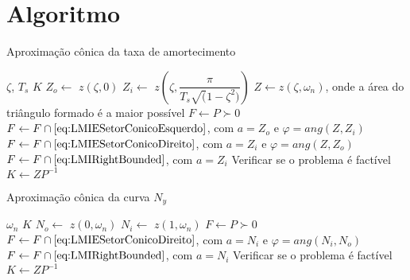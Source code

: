 \chapter{Algoritmo}


\begin{algorithm}[hbt!]
  \caption{Aproximação cônica da taxa de amortecimento}\label{alg:AproximacaoConicaZeta}
  \begin{algorithmic}[1]
    \Require $\zeta$, $T_s$
    \Ensure $K$
    \State $Z_o \gets $ $z(\zeta,0)$
    \State $Z_i \gets $ $z\left(\zeta,\dfrac{\pi}{T_s\sqrt(1-\zeta^2)}\right)$
    \State $Z \gets z(\zeta,\omega_n)$, onde a área do triângulo formado é a maior possível
    \State $F \gets P \succ 0$
    \State $F \gets F \cap \eqref{eq:LMIESetorConicoEsquerdo}$, com $a = Z_o$ e $\varphi = ang(Z,Z_i)$ 
    \State $F \gets F \cap \eqref{eq:LMIESetorConicoDireito}$, com $a = Z_i$ e $\varphi = ang(Z,Z_o)$ 
    \State $F \gets F \cap \eqref{eq:LMIRightBounded}$, com $a = Z_i$  
    \State Verificar se o problema é factível
    \State $K \gets ZP^{-1}$
  \end{algorithmic}
\end{algorithm}

\begin{algorithm}[hbt!]
  \caption{Aproximação cônica da curva $N_y$}\label{alg:AproximacaoConicaNy}
  \begin{algorithmic}[1]
    \Require $\omega_n$
    \Ensure $K$
    \State $N_o \gets $ $z(0,\omega_n)$
    \State $N_i \gets $ $z(1,\omega_n)$
    \State $F \gets P \succ 0$
    \State $F \gets F \cap \eqref{eq:LMIESetorConicoDireito}$, com $a = N_i$ e $\varphi = ang(N_i,N_o)$ 
    \State $F \gets F \cap \eqref{eq:LMIRightBounded}$, com $a = N_i$ 
    \State Verificar se o problema é factível
    \State $K \gets ZP^{-1}$
  \end{algorithmic}
\end{algorithm}